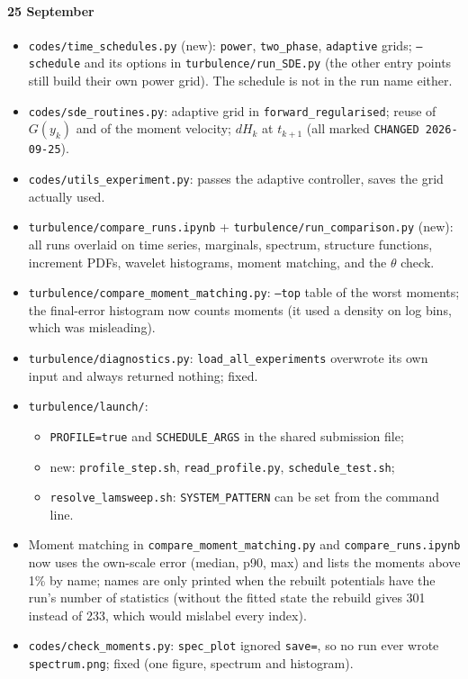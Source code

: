 \documentclass[11pt,a4paper]{article}
\newcommand{\code}[1]{\texttt{#1}}
\begin{document}
\paragraph{25 September}
\begin{itemize}
  \item \code{codes/time\_schedules.py} (new): \code{power}, \code{two\_phase}, \code{adaptive} grids;
        \code{--schedule} and its options in \code{turbulence/run\_SDE.py} (the other entry points still
        build their own power grid). The schedule is not in the run name either.
  \item \code{codes/sde\_routines.py}: adaptive grid in \code{forward\_regularised}; reuse of $G(y_k)$
        and of the moment velocity; $dH_k$ at $t_{k+1}$ (all marked \code{CHANGED 2026-09-25}).
  \item \code{codes/utils\_experiment.py}: passes the adaptive controller, saves the grid actually used.
  \item \code{turbulence/compare\_runs.ipynb} + \code{turbulence/run\_comparison.py} (new): all runs
        overlaid on time series, marginals, spectrum, structure functions, increment PDFs, wavelet
        histograms, moment matching, and the $\theta$ check.
  \item \code{turbulence/compare\_moment\_matching.py}: \code{--top} table of the worst moments; the
        final-error histogram now counts moments (it used a density on log bins, which was misleading).
  \item \code{turbulence/diagnostics.py}: \code{load\_all\_experiments} overwrote its own input and
        always returned nothing; fixed.
  \item \code{turbulence/launch/}:
        \begin{itemize}
          \item \code{PROFILE=true} and \code{SCHEDULE\_ARGS} in the shared submission file;
          \item new: \code{profile\_step.sh}, \code{read\_profile.py}, \code{schedule\_test.sh};
          \item \code{resolve\_lamsweep.sh}: \code{SYSTEM\_PATTERN} can be set from the command line.
        \end{itemize}
  \item Moment matching in \code{compare\_moment\_matching.py} and \code{compare\_runs.ipynb} now uses the
        own-scale error (median, p90, max) and lists the moments above 1\% by name; names are only printed
        when the rebuilt potentials have the run's number of statistics (without the fitted state the
        rebuild gives 301 instead of 233, which would mislabel every index).
  \item \code{codes/check\_moments.py}: \code{spec\_plot} ignored \code{save=}, so no run ever wrote
        \code{spectrum.png}; fixed (one figure, spectrum and histogram).
\end{itemize}
\end{document}
